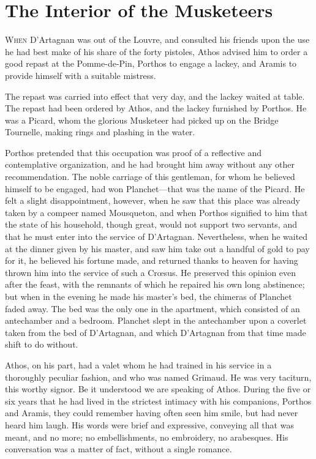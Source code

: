
\chapter{The Interior of the Musketeers}

\lettrine{W}{hen} D'Artagnan was out of the Louvre, and consulted his friends upon the use he had best make of his share of the forty pistoles, Athos advised him to order a good repast at the Pomme-de-Pin, Porthos to engage a lackey, and Aramis to provide himself with a suitable mistress. 

The repast was carried into effect that very day, and the lackey waited at table. The repast had been ordered by Athos, and the lackey furnished by Porthos. He was a Picard, whom the glorious Musketeer had picked up on the Bridge Tournelle, making rings and plashing in the water. 

Porthos pretended that this occupation was proof of a reflective and contemplative organization, and he had brought him away without any other recommendation. The noble carriage of this gentleman, for whom he believed himself to be engaged, had won Planchet—that was the name of the Picard. He felt a slight disappointment, however, when he saw that this place was already taken by a compeer named Mousqueton, and when Porthos signified to him that the state of his household, though great, would not support two servants, and that he must enter into the service of D'Artagnan. Nevertheless, when he waited at the dinner given by his master, and saw him take out a handful of gold to pay for it, he believed his fortune made, and returned thanks to heaven for having thrown him into the service of such a Crœsus. He preserved this opinion even after the feast, with the remnants of which he repaired his own long abstinence; but when in the evening he made his master's bed, the chimeras of Planchet faded away. The bed was the only one in the apartment, which consisted of an antechamber and a bedroom. Planchet slept in the antechamber upon a coverlet taken from the bed of D'Artagnan, and which D'Artagnan from that time made shift to do without. 

Athos, on his part, had a valet whom he had trained in his service in a thoroughly peculiar fashion, and who was named Grimaud. He was very taciturn, this worthy signor. Be it understood we are speaking of Athos. During the five or six years that he had lived in the strictest intimacy with his companions, Porthos and Aramis, they could remember having often seen him smile, but had never heard him laugh. His words were brief and expressive, conveying all that was meant, and no more; no embellishments, no embroidery, no arabesques. His conversation was a matter of fact, without a single romance. 


